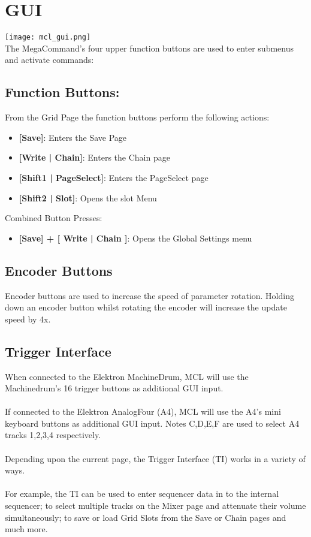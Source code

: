 \chapter{GUI}

\texttt{[image: mcl\_gui.png]}\\
The MegaCommand's four upper function buttons are used to enter submenus and activate commands:
\section{Function Buttons:}
From the Grid Page the function buttons perform the following actions:
\begin{itemize}
\item{\textbf{[Save]}: Enters the Save Page}
\item{\textbf{[Write | Chain]}: Enters the Chain page}
\item{\textbf{[Shift1 | PageSelect]}: Enters the PageSelect page}
\item{\textbf{[Shift2 | Slot]}: Opens the slot Menu }
\end{itemize}
Combined Button Presses:
\begin{itemize}
\item{\textbf{[Save] + [ Write | Chain ]}: Opens the Global Settings menu }
\end{itemize}

\section{Encoder Buttons}
Encoder buttons are used to increase the speed of parameter rotation.
Holding down an encoder button whilst rotating the encoder will increase the update speed by 4x.

\section{Trigger Interface}
When connected to the Elektron MachineDrum, MCL will use the Machinedrum's 16 trigger buttons as additional GUI input. \\
\\
If connected to the Elektron AnalogFour (A4), MCL will use the A4's mini keyboard buttons as additional GUI input. Notes C,D,E,F are used to select A4 tracks 1,2,3,4 respectively.\\
\\
Depending upon the current page, the Trigger Interface (TI) works in a variety of ways.\\
\\For example, the TI can be used to enter sequencer data in to the internal sequencer;
to select multiple tracks on the Mixer page and attenuate their volume simultaneously; to save or load Grid Slots from the Save or Chain pages and much more.

